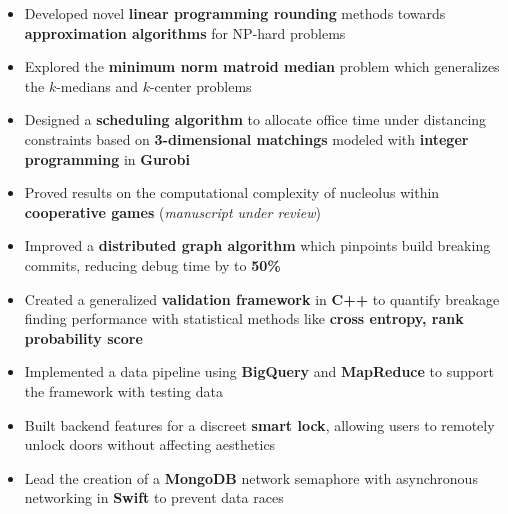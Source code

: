 \documentclass[11pt,a4paper,ragged2e]{altacv}
\begin{document}
\begin{paracol}{2}
\makecvheader

\begin{itemize}
    \item Developed novel \textbf{linear programming rounding} methods
      towards \textbf{approximation algorithms} for NP-hard problems
    \item Explored the \textbf{minimum norm matroid median} problem
      which generalizes the $k$-medians and $k$-center problems
\end{itemize}

\divider

\begin{itemize}
    \item Designed a \textbf{scheduling algorithm} to allocate office time under distancing constraints
      based on \textbf{3-dimensional matchings} modeled with \textbf{integer programming} in \textbf{Gurobi}
    \item Proved results on the computational complexity of nucleolus
      within \textbf{cooperative games}
      (\emph{manuscript under review})
\end{itemize}

\divider

\begin{itemize}
    \item Improved a \textbf{distributed graph algorithm} which pinpoints build breaking commits,
      reducing debug time by to \textbf{50\%}
    \item Created a generalized \textbf{validation framework} in \textbf{C++}
      to quantify breakage finding performance
      with statistical methods like \textbf{cross entropy, rank probability score}
    \item Implemented a data pipeline using \textbf{BigQuery} and \textbf{MapReduce}
      to support the framework with testing data
\end{itemize}

\divider

\begin{itemize}
    \item Built backend features for a discreet \textbf{smart lock},
      allowing users to remotely unlock doors without affecting aesthetics
    \item Lead the creation of a \textbf{MongoDB} network semaphore with asynchronous networking in \textbf{Swift}
      to prevent data races
\end{itemize}


\end{paracol}
\end{document}
